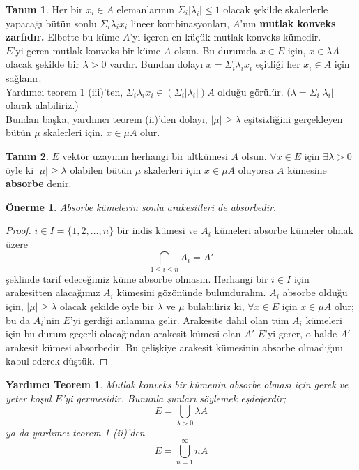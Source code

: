 \documentclass[11pt]{article}
\theoremstyle{plain}
\newtheorem{lemma}{Yardımcı Teorem}
\newtheorem{proposition}{Önerme}
\theoremstyle{definition}
\newtheorem{definition}{Tanım}
\theoremstyle{remark}
\numberwithin{equation}{section}
\renewcommand{\%}{{\small \%}}
\begin{document}
\begin{definition}
Her bir $x_i\in A$ elemanlarının $\Sigma_i |\lambda_i|\leq 1$ olacak şekilde skalerlerle yapacağı bütün sonlu $\Sigma_i \lambda_i x_i$ lineer kombinasyonları, $A$'nın \textbf{mutlak konveks zarfıdır.} Elbette bu küme $A$'yı içeren en küçük mutlak konveks kümedir.\\[3pt]
$E$'yi geren mutlak konveks bir küme $A$ olsun. Bu durumda $x\in E$ için, $x\in \lambda A$ olacak şekilde bir $\lambda >0$ vardır. Bundan dolayı $x=\Sigma_i \lambda_i x_i$ eşitliği her $x_i\in A$ için sağlanır.\\
Yardımcı teorem 1 (iii)'ten, $\Sigma_i \lambda_i x_i\in \left(\Sigma_i |\lambda_i|\right)A$ olduğu görülür. ($\lambda=\Sigma_i |\lambda_i|$ olarak alabiliriz.)\\
Bundan başka, yardımcı teorem (ii)'den dolayı, $|\mu|\geq\lambda$ eşitsizliğini gerçekleyen bütün $\mu$ skalerleri için, $x\in\mu A$ olur.
\end{definition}

\begin{definition}
$E$ vektör uzayının herhangi bir altkümesi $A$ olsun. $\forall x\in E$ için $\exists \lambda >0$ öyle ki $|\mu|\geq \lambda$ olabilen bütün $\mu$ skalerleri için $x\in\mu A$ oluyorsa $A$ kümesine \textbf{absorbe} denir.\newpage
\end{definition}

\begin{proposition}
Absorbe kümelerin sonlu arakesitleri de absorbedir.
\end{proposition}
\begin{proof}
$i\in I=\{1, 2,\ldots ,n\}$ bir indis kümesi ve \underline{$A_i$ kümeleri absorbe kümeler} olmak üzere
\[
\bigcap_{1\leq i\leq n}A_i =A'
\]
şeklinde tarif edeceğimiz küme absorbe olmasın. Herhangi bir $i\in I$ için arakesitten alacağımız $A_i$ kümesini gözönünde bulunduralım. $A_i$ absorbe olduğu için, $|\mu|\geq\lambda$ olacak şekilde öyle bir $\lambda $ ve $\mu$ bulabiliriz ki, $\forall x\in E$ için $x\in\mu A$ olur; bu da $A_i$'nin $E$'yi gerdiği anlamına gelir. Arakesite dahil olan tüm $A_i$ kümeleri için bu durum geçerli olacağından arakesit kümesi olan $A'$ $E$'yi gerer, o halde $A'$ arakesit kümesi absorbedir. Bu çelişkiye arakesit kümesinin absorbe olmadığını kabul ederek düştük. 
\end{proof}
\begin {lemma}
Mutlak konveks bir kümenin absorbe olması için gerek ve yeter koşul $E$'yi germesidir. Bununla şunları söylemek eşdeğerdir;
\[
E=\bigcup_{\lambda > 0}\lambda A
\] ya da yardımcı teorem 1 (ii)'den 
\[
E=\bigcup_{n=1}^{\infty}nA
\]
\end{lemma}
\end{document}
